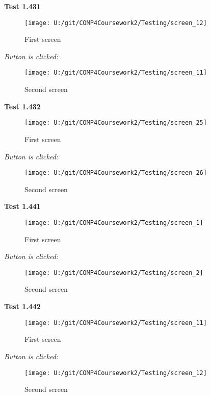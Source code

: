 \textbf{Test 1.431}

\begin{figure}[H]
    \label{fig: First Screen}\caption{First screen}
    \texttt{[image: U:/git/COMP4Coursework2/Testing/screen\_12]}
\end{figure}

\textit{Button is clicked: }

\begin{figure}[H]
    \label{fig: Second Screen}\caption{Second screen}
    \texttt{[image: U:/git/COMP4Coursework2/Testing/screen\_11]}
\end{figure}

\textbf{Test 1.432}

\begin{figure}[H]
    \label{fig: First Screen}\caption{First screen}
    \texttt{[image: U:/git/COMP4Coursework2/Testing/screen\_25]}
\end{figure}

\textit{Button is clicked: }

\begin{figure}[H]
    \label{fig: Second Screen}\caption{Second screen}
    \texttt{[image: U:/git/COMP4Coursework2/Testing/screen\_26]}
\end{figure}

\textbf{Test 1.441}

\begin{figure}[H]
    \label{fig: First Screen}\caption{First screen}
    \texttt{[image: U:/git/COMP4Coursework2/Testing/screen\_1]}
\end{figure}

\textit{Button is clicked: }

\begin{figure}[H]
    \label{fig: Second Screen}\caption{Second screen}
    \texttt{[image: U:/git/COMP4Coursework2/Testing/screen\_2]}
\end{figure}

\textbf{Test 1.442}

\begin{figure}[H]
    \label{fig: First Screen}\caption{First screen}
    \texttt{[image: U:/git/COMP4Coursework2/Testing/screen\_11]}
\end{figure}

\textit{Button is clicked: }

\begin{figure}[H]
    \label{fig: Second Screen}\caption{Second screen}
    \texttt{[image: U:/git/COMP4Coursework2/Testing/screen\_12]}
\end{figure}

